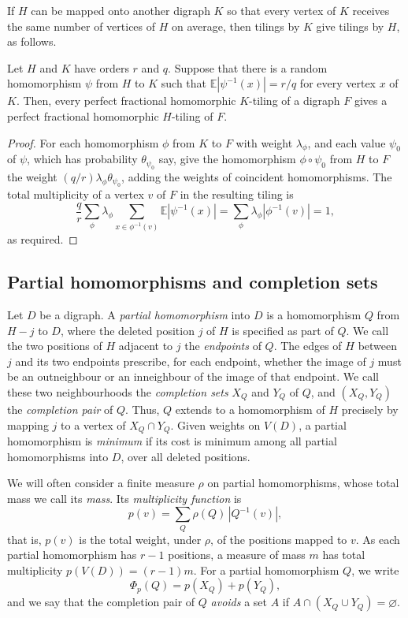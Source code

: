 If $H$ can be mapped onto another digraph $K$ so that every vertex of $K$ receives the same number of vertices of $H$ on average, then tilings by $K$ give tilings by $H$, as follows.

\begin{lemma}\label{transfer:fibres}
Let $H$ and $K$ have orders $r$ and $q$. Suppose that there is a random homomorphism
$\psi$ from $H$ to $K$ such that $\mathbb E|\psi^{-1}(x)|=r/q$ for every vertex $x$ of $K$.
Then, every perfect fractional homomorphic $K$-tiling of a digraph $F$ gives a
perfect fractional homomorphic $H$-tiling of $F$.
\end{lemma}
\begin{proof}
For each homomorphism $\phi$ from $K$ to $F$ with weight $\lambda_\phi$, and each value $\psi_0$ of $\psi$, which has probability $\theta_{\psi_0}$ say, give the homomorphism $\phi\circ\psi_0$ from $H$ to $F$ the weight
$(q/r)\lambda_\phi\theta_{\psi_0}$, adding the weights of coincident homomorphisms.
The total multiplicity of a vertex $v$ of $F$ in the resulting tiling is
\[
 \frac qr\sum_\phi\lambda_\phi
 \sum_{x\in\phi^{-1}(v)}\mathbb E|\psi^{-1}(x)|
 =\sum_\phi\lambda_\phi|\phi^{-1}(v)|=1,
\]
as required.
\end{proof}

\subsection{Partial homomorphisms and completion sets}\label{sec:prelim-completion}

Let $D$ be a digraph. A \emph{partial homomorphism} into $D$ is a homomorphism $Q$ from $H-j$ to $D$, where the deleted position $j$ of $H$ is specified as part of $Q$.
We call the two positions of $H$ adjacent to $j$ the \emph{endpoints} of $Q$.
The edges of $H$ between $j$ and its two endpoints prescribe, for each endpoint, whether the image of $j$ must be an outneighbour or an inneighbour of the image of that endpoint.
We call these two neighbourhoods the \emph{completion sets} $X_Q$ and $Y_Q$ of $Q$, and $(X_Q,Y_Q)$ the \emph{completion pair} of $Q$.
Thus, $Q$ extends to a homomorphism of $H$ precisely by mapping $j$ to a vertex of $X_Q\cap Y_Q$.
Given weights on $V(D)$, a partial homomorphism is \emph{minimum} if its cost is minimum among all partial homomorphisms into $D$, over all deleted positions.

We will often consider a finite measure $\rho$ on partial homomorphisms, whose total mass we call its \emph{mass}. Its \emph{multiplicity function} is
\[
 p(v)=\sum_Q\rho(Q)\,|Q^{-1}(v)|,
\]
that is, $p(v)$ is the total weight, under $\rho$, of the positions mapped to $v$. As each partial homomorphism has $r-1$ positions, a measure of mass $m$ has total multiplicity $p(V(D))=(r-1)m$. For a partial homomorphism $Q$, we write
\[
 \Phi_p(Q)=p(X_Q)+p(Y_Q),
\]
and we say that the completion pair of $Q$ \emph{avoids} a set $A$ if $A\cap(X_Q\cup Y_Q)=\varnothing$.

